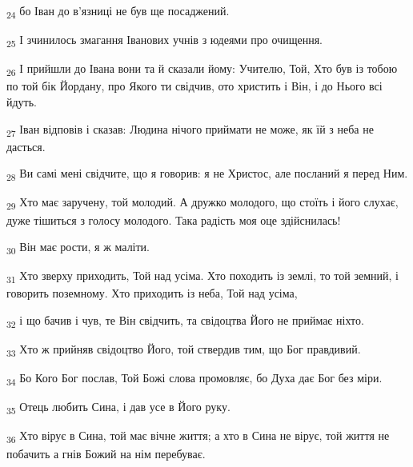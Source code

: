 \begin{tcolorbox}
\textsubscript{24} бо Іван до в'язниці не був ще посаджений.
\end{tcolorbox}
\begin{tcolorbox}
\textsubscript{25} І зчинилось змагання Іванових учнів з юдеями про очищення.
\end{tcolorbox}
\begin{tcolorbox}
\textsubscript{26} І прийшли до Івана вони та й сказали йому: Учителю, Той, Хто був із тобою по той бік Йордану, про Якого ти свідчив, ото христить і Він, і до Нього всі йдуть.
\end{tcolorbox}
\begin{tcolorbox}
\textsubscript{27} Іван відповів і сказав: Людина нічого приймати не може, як їй з неба не дасться.
\end{tcolorbox}
\begin{tcolorbox}
\textsubscript{28} Ви самі мені свідчите, що я говорив: я не Христос, але посланий я перед Ним.
\end{tcolorbox}
\begin{tcolorbox}
\textsubscript{29} Хто має заручену, той молодий. А дружко молодого, що стоїть і його слухає, дуже тішиться з голосу молодого. Така радість моя оце здійснилась!
\end{tcolorbox}
\begin{tcolorbox}
\textsubscript{30} Він має рости, я ж маліти.
\end{tcolorbox}
\begin{tcolorbox}
\textsubscript{31} Хто зверху приходить, Той над усіма. Хто походить із землі, то той земний, і говорить поземному. Хто приходить із неба, Той над усіма,
\end{tcolorbox}
\begin{tcolorbox}
\textsubscript{32} і що бачив і чув, те Він свідчить, та свідоцтва Його не приймає ніхто.
\end{tcolorbox}
\begin{tcolorbox}
\textsubscript{33} Хто ж прийняв свідоцтво Його, той ствердив тим, що Бог правдивий.
\end{tcolorbox}
\begin{tcolorbox}
\textsubscript{34} Бо Кого Бог послав, Той Божі слова промовляє, бо Духа дає Бог без міри.
\end{tcolorbox}
\begin{tcolorbox}
\textsubscript{35} Отець любить Сина, і дав усе в Його руку.
\end{tcolorbox}
\begin{tcolorbox}
\textsubscript{36} Хто вірує в Сина, той має вічне життя; а хто в Сина не вірує, той життя не побачить а гнів Божий на нім перебуває.
\end{tcolorbox}
